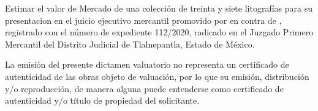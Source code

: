 Estimar el valor de Mercado de \textcolor{principal}{una colecci\'on de treinta y siete litograf\'ias} para su presentaci\¡on en el juicio ejecutivo mercantil promovido por \insertar en contra de \insertar, registrado con el n\'umero de expediente 112/2020, radicado en el Juzgado Primero Mercantil del Distrito Judicial de Tlalnepantla, Estado de M\'exico.

La emisi\'on del presente dictamen valuatorio no representa un certificado de autenticidad de las obras objeto de valuaci\'on, por lo que su emisi\'on, distribuci\'on y/o reproducci\'on, de manera alguna puede entenderse como certificado de autenticidad y/o título de propiedad del solicitante.